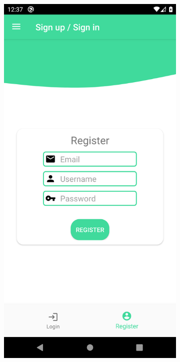 \begin{figure}[H]
    \captionsetup[subfigure]{justification=centering}
    \begin{center}
        \begin{subfigure}{.3\textwidth}
            \includegraphics[scale=0.1, width=\textwidth]{_figures/register.png}

\end{subfigure}
\end{center}
\end{figure}
